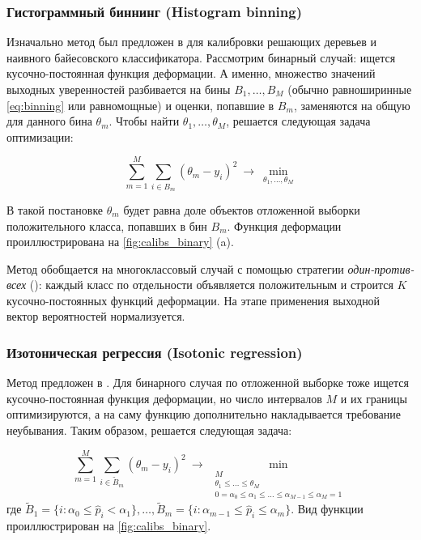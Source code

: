 \documentclass[12pt]{article}
\begin{document}

\subsubsection{Гистограммный биннинг (Histogram binning)}
Изначально метод был предложен в \cite{hist_binning} для калибровки решающих деревьев и наивного байесовского классификатора. Рассмотрим бинарный случай: ищется кусочно-постоянная функция деформации. А именно, множество значений выходных уверенностей разбивается на бины $B_1,\dots,B_M$ (обычно равноширинные \eqref{eq:binning} или равномощные) и оценки, попавшие в $B_m$, заменяются на общую для данного бина $\theta_m$. Чтобы найти $\theta_1,\dots,\theta_M$, решается следующая задача оптимизации:

\begin{equation}\label{eq:hist_binning}
\sum_{m=1}^{M}\sum_{i\in B_m}
\left(\theta_m - y_i\right)^2 \ \to \
\min_{\theta_1,\dots, \theta_M}
\end{equation}

В такой постановке $\theta_m$ будет равна доле объектов отложенной выборки положительного класса, попавших в бин $B_m$. Функция деформации проиллюстрирована на \autoref{fig:calibs_binary} (a). 

Метод обобщается на многоклассовый случай с помощью стратегии \emph{один-против-всех} (): каждый класс по отдельности объявляется положительным и строится $K$ кусочно-постоянных функций деформации. На этапе применения выходной вектор вероятностей нормализуется.


\subsubsection{Изотоническая регрессия (Isotonic regression)}

Метод предложен в \cite{isotonic}. Для бинарного случая по отложенной выборке тоже ищется кусочно-постоянная функция деформации, но число интервалов $M$ и их границы оптимизируются, а на саму функцию дополнительно накладывается требование неубывания. Таким образом, решается следующая задача:

\begin{equation}\label{eq:isotonic}
\sum_{m=1}^{M}\sum_{i\in \tilde{B}_m}
\left(\theta_m - y_i\right)^2 \ \to \
\min_{\substack{
    M \\
    \theta_1 \leqslant \dots \leqslant \theta_M \\
    0=\alpha_0 \leqslant \alpha_1 \leqslant \dots \leqslant \alpha_{M-1} \leqslant \alpha_M = 1
}}
\end{equation}
где 
$\tilde{B}_1 =\{i: \alpha_0 \leqslant \hat{p}_i < \alpha_1\},
\dots,
\tilde{B}_{m} =\{i: \alpha_{m-1} \leqslant \hat{p}_i \leqslant \alpha_m\}$. Вид функции проиллюстрирован на \autoref{fig:calibs_binary}.
\end{document}
